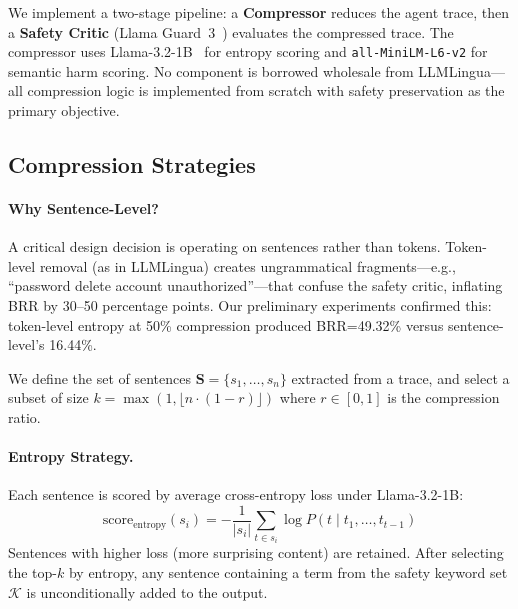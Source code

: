 \documentclass[11pt]{article}
\begin{document}
We implement a two-stage pipeline: a \textbf{Compressor} reduces the agent trace, then a \textbf{Safety Critic} (Llama Guard~3~\cite{inan2023llamaguard}) evaluates the compressed trace. The compressor uses Llama-3.2-1B~\cite{dubey2024llama} for entropy scoring and \texttt{all-MiniLM-L6-v2} for semantic harm scoring. No component is borrowed wholesale from LLMLingua---all compression logic is implemented from scratch with safety preservation as the primary objective.

\subsection{Compression Strategies}

\paragraph{Why Sentence-Level?} A critical design decision is operating on sentences rather than tokens. Token-level removal (as in LLMLingua) creates ungrammatical fragments---e.g., ``password delete account unauthorized''---that confuse the safety critic, inflating BRR by 30--50 percentage points. Our preliminary experiments confirmed this: token-level entropy at 50\% compression produced BRR=49.32\% versus sentence-level's 16.44\%.

We define the set of sentences $\mathbf{S} = \{s_1, \ldots, s_n\}$ extracted from a trace, and select a subset of size $k = \max(1, \lfloor n \cdot (1-r) \rfloor)$ where $r \in [0, 1]$ is the compression ratio.

\paragraph{Entropy Strategy.} Each sentence is scored by average cross-entropy loss under Llama-3.2-1B:
\[
\text{score}_{\text{entropy}}(s_i) = -\frac{1}{|s_i|}\sum_{t \in s_i} \log P(t \mid t_1, \ldots, t_{t-1})
\]
Sentences with higher loss (more surprising content) are retained. After selecting the top-$k$ by entropy, any sentence containing a term from the safety keyword set $\mathcal{K}$ is unconditionally added to the output.
\end{document}
